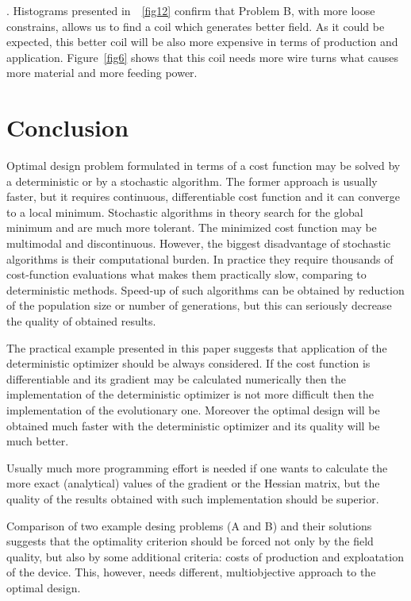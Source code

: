 \documentclass[twocolumn,a4paper]{article}
\def\rref#1{\figurename~\ref{#1}}
\begin{document}
\hphantom.
\bigskip
Histograms presented in~\rref{fig12} confirm that Problem B, with more loose constrains, allows us to
find a coil which generates better field. As it could be expected, this better coil will be also more
expensive in terms of production and application. Figure~\ref{fig6} shows that this coil needs more wire
turns what causes more material and more feeding power.


\section{Conclusion}

Optimal design problem formulated in terms of a cost function may be solved by a deterministic or by a stochastic algorithm. The former approach is usually faster, but it requires continuous, differentiable cost function and it can converge to a local minimum. Stochastic algorithms in theory search for the global minimum and are much more tolerant. The minimized cost
function may be multimodal and discontinuous. However, the biggest disadvantage of stochastic algorithms is their computational burden. In practice they require thousands of cost-function evaluations what makes them practically slow, comparing to deterministic methods.
Speed-up of such algorithms can be obtained by reduction of the population size or number of generations, but this can seriously
decrease the quality of obtained results.

The practical example presented in this paper suggests that application of the deterministic optimizer should be always considered. If the cost function is differentiable and its gradient may be calculated numerically then the implementation
of the deterministic optimizer is not more difficult then the implementation of the evolutionary one. Moreover the
optimal design will be obtained much faster with the deterministic optimizer and its quality will be much better.

Usually much more programming effort is needed if one wants to calculate the more exact (analytical) values of the gradient
or the Hessian matrix, but the quality of the results obtained with such implementation should be superior.

Comparison of two example desing problems (A and B) and their solutions suggests that the optimality criterion should be
forced not only by the field quality, but also by some additional criteria: costs of production and exploatation of the device.
This, however, needs different, multiobjective approach to the optimal design.
\end{document}
